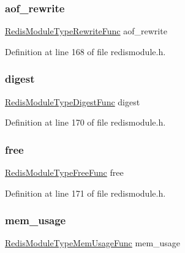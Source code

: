 \subsubsection{\texorpdfstring{aof\+\_\+rewrite}{aof\_rewrite}}
{\footnotesize\ttfamily \hyperlink{redismodule_8h_a5367d50c79d673c161a718ba3bcde693}{Redis\+Module\+Type\+Rewrite\+Func} aof\+\_\+rewrite}



Definition at line 168 of file redismodule.\+h.

\mbox{\label{struct_redis_module_type_methods_a9404b8fe8414df37298075b8593e9622}} 
\subsubsection{\texorpdfstring{digest}{digest}}
{\footnotesize\ttfamily \hyperlink{redismodule_8h_a44a0e6c440bd362fc5e1709964339573}{Redis\+Module\+Type\+Digest\+Func} digest}



Definition at line 170 of file redismodule.\+h.

\mbox{\label{struct_redis_module_type_methods_a6e612ef6fa670ac9b1d4b671d3a915c5}} 
\subsubsection{\texorpdfstring{free}{free}}
{\footnotesize\ttfamily \hyperlink{redismodule_8h_aa8cecfc7db337e1e9a513248fbd01c4f}{Redis\+Module\+Type\+Free\+Func} free}



Definition at line 171 of file redismodule.\+h.

\mbox{\label{struct_redis_module_type_methods_a0d0e3f0ba457ea00310871d07f907277}} 
\subsubsection{\texorpdfstring{mem\+\_\+usage}{mem\_usage}}
{\footnotesize\ttfamily \hyperlink{redismodule_8h_a52efa69c9698bf053fdcea638922fc2a}{Redis\+Module\+Type\+Mem\+Usage\+Func} mem\+\_\+usage}



